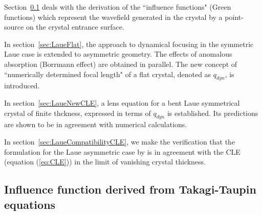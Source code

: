 \documentclass[preprint]{iucr}              %
\newcommand{\inblue}[1]{{\color{blue}#1}}
\newcommand{\inred}[1]{{\color{red}#1}}
\begin{document}
\inred{
Section~\ref{sec:influence} deals with the derivation of the ``influence functions" (Green functions) which represent the wavefield generated in the crystal by a point-source on the crystal entrance surface.

In section~\ref{sec:LaueFlat}, the approach to dynamical focusing in the symmetric Laue case
\cite{kushnir, GuigayFerrero2013}
is extended to asymmetric geometry. The effects of anomalous absorption (Borrmann effect) are obtained in parallel. The new concept of ``numerically determined focal length" of a flat crystal, denoted as $q_{dyn}$, is introduced.

In section~\ref{sec:LaueNewCLE}, a lens equation for a bent Laue symmetrical crystal of finite thckness, expressed in terms of $q_{dyn}$ is established. Its predictions are shown to be in agreement with numerical calculations. 

In section~\ref{sec:LaueCompatibilityCLE}, we make the verification that the formulation for the Laue asymmetric case by
\cite{GuigayFerrero2016} is in agreement with the CLE (equation (\ref{eq:CLE})) in the limit of vanishing crystal thickness.}

\subsection{Influence function derived from Takagi-Taupin equations}
\label{sec:influence}
\end{document}
